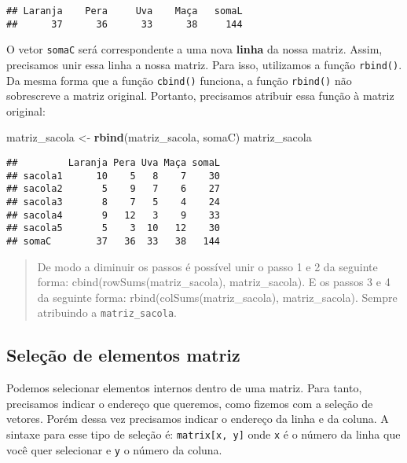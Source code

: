\documentclass[]{book}
\newenvironment{Shaded}{\begin{snugshade}}{\end{snugshade}}
\newcommand{\KeywordTok}[1]{\textcolor[rgb]{0.13,0.29,0.53}{\textbf{#1}}}
\newcommand{\NormalTok}[1]{#1}
\newcommand{\StringTok}[1]{\textcolor[rgb]{0.31,0.60,0.02}{#1}}
\theoremstyle{definition}
\theoremstyle{definition}
\theoremstyle{definition}
\theoremstyle{remark}
\begin{document}
\begin{verbatim}
## Laranja    Pera     Uva    Maça   somaL 
##      37      36      33      38     144
\end{verbatim}

O vetor \texttt{somaC} será correspondente a uma nova \textbf{linha} da nossa matriz. Assim, precisamos unir essa linha a nossa matriz. Para isso, utilizamos a função \texttt{rbind()}. Da mesma forma que a função \texttt{cbind()} funciona, a função \texttt{rbind()} não sobrescreve a matriz original. Portanto, precisamos atribuir essa função à matriz original:

\begin{Shaded}
\begin{Highlighting}[]
\NormalTok{matriz_sacola <-}\StringTok{ }\KeywordTok{rbind}\NormalTok{(matriz_sacola, somaC)}
\NormalTok{matriz_sacola}
\end{Highlighting}
\end{Shaded}

\begin{verbatim}
##         Laranja Pera Uva Maça somaL
## sacola1      10    5   8    7    30
## sacola2       5    9   7    6    27
## sacola3       8    7   5    4    24
## sacola4       9   12   3    9    33
## sacola5       5    3  10   12    30
## somaC        37   36  33   38   144
\end{verbatim}

\begin{quote}
De modo a diminuir os passos é possível unir o passo 1 e 2 da seguinte forma: cbind(rowSums(matriz\_sacola), matriz\_sacola). E os passos 3 e 4 da seguinte forma: rbind(colSums(matriz\_sacola), matriz\_sacola). Sempre atribuindo a \texttt{matriz\_sacola}.
\end{quote}

\hypertarget{seleuxe7uxe3o-de-elementos-matriz}{%
\subsection{Seleção de elementos matriz}\label{seleuxe7uxe3o-de-elementos-matriz}}

Podemos selecionar elementos internos dentro de uma matriz. Para tanto, precisamos indicar o endereço que queremos, como fizemos com a seleção de vetores. Porém dessa vez precisamos indicar o endereço da linha e da coluna. A sintaxe para esse tipo de seleção é: \texttt{matrix{[}x,\ y{]}} onde \texttt{x} é o número da linha que você quer selecionar e \texttt{y} o número da coluna.
\end{document}
